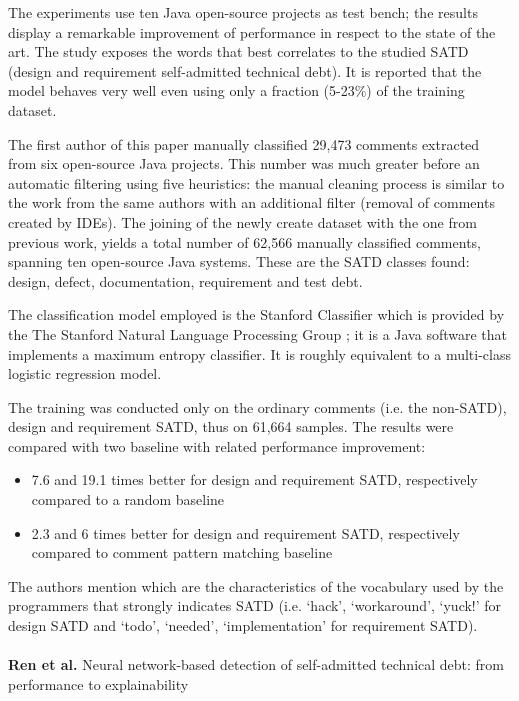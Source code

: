 The experiments use ten Java open-source projects as test bench; the results display a remarkable improvement of performance in respect to the state of the art.
The study exposes the words that best correlates to the studied SATD (design and requirement self-admitted technical debt). 
It is reported that the model behaves very well even using only a fraction (5-23\%) of the training dataset.

The first author of this paper manually classified 29,473 comments extracted from six open-source Java projects. This number was much greater before an automatic filtering using five heuristics: the manual cleaning process is similar to the work from the same authors  \cite{maldonado2015detecting} with an additional filter (removal of comments created by IDEs).
The joining of the newly create dataset with the one from previous work, yields a total number of 62,566 manually classified comments, spanning ten open-source Java systems. These are the SATD classes found: design, defect, documentation, requirement and test debt. 

The classification model employed is the Stanford Classifier which is provided by the The Stanford Natural Language Processing Group \cite{manning2003optimization}; it is a Java software that implements a maximum entropy classifier. It is roughly equivalent to a multi-class logistic regression model.

The training was conducted only on the ordinary comments (i.e. the non-SATD), design and requirement SATD, thus on 61,664 samples.
The results were compared with two baseline with related performance improvement: 
\begin{itemize}
    \item 7.6 and 19.1 times better for design and requirement SATD, respectively compared to a random baseline
    \item 2.3 and 6 times better for design and requirement SATD, respectively compared to comment pattern matching baseline
\end{itemize}

The authors mention which are the characteristics of the vocabulary used by the programmers that strongly indicates SATD (i.e. `hack', `workaround', `yuck!' for design SATD and `todo', `needed', `implementation' for requirement SATD).
\\
\\
\textbf{Ren et al.} \cite{ren2019neural} Neural network-based detection of self-admitted technical debt: from performance to explainability

